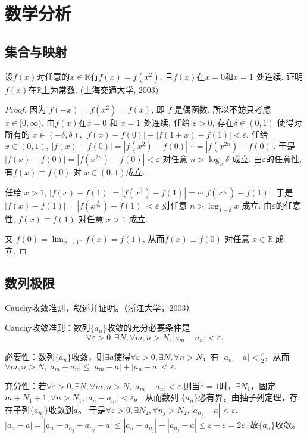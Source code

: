 \chapter{数学分析}



\section{集合与映射}

\begin{example}
设$f(x)$对任意的$x\in \mathbb{R}$有$f(x)=f(x^2)$, 且$f(x)$在$x=0$和$x=1$ 处连续. 证明$f(x)$在$\mathbb{R}$上为常数. (上海交通大学, 2003)
\end{example}

\begin{proof}
因为 $f(-x)= f(x^2) = f(x)$, 即 $f$ 是偶函数, 所以不妨只考虑 $x\in[0,\infty)$.
由$f(x)$在$x=0$ 和 $x=1$ 处连续, 
任给 $\varepsilon>0$, 存在$\delta\in(0,1)$ 使得对所有的 $x\in(-\delta,\delta)$, 
$|f(x)-f(0)| + |f(1+x)-f(1)| < \varepsilon$. 
任给 $x\in(0,1)$, $|f(x)-f(0)|=|f(x^2)-f(0)|\cdots=|f(x^{2n})-f(0)|$.
于是 $|f(x)-f(0)|=|f(x^{2n})-f(0)|<\varepsilon$ 对任意 $n> \log_x \delta$ 成立.
由$\varepsilon$的任意性, 有$f(x)\equiv f(0)$ 对 $x\in(0,1)$成立.

任给 $x>1$, $|f(x)-f(1)|=|f(x^{\frac12})-f(1)|=\cdots|f(x^{\frac1{2n}})-f(1)|$. 
于是 $|f(x)-f(1)|=|f(x^{\frac1{2n}})-f(1)|<\varepsilon$ 对任意 $n> \log_{1+\delta}x$ 成立.
由$\varepsilon$的任意性, $f(x) \equiv f(1)$ 对任意 $x>1$ 成立.

又 $f(0)=\lim_{x\rightarrow1^-}f(x)=f(1)$, 
从而$f(x)\equiv f(0)$ 对任意 $x\in \mathbb{R}$ 成立.
\end{proof}

\section{数列极限}

  \begin{example}
   Cauchy收敛准则，叙述并证明。（浙江大学，2003）
  \end{example}

  \begin{solution}
  Cauchy收敛准则：数列$\{a_n\}$收敛的充分必要条件是$$\forall\varepsilon>0,\exists N,\forall m,n>N,|a_m-a_n|<\varepsilon.$$
  
  必要性：数列$\{a_n\}$收敛，则$\exists a$使得$\forall\varepsilon>0,\exists N,\forall n>N$，有
  $|a_n-a|<\frac{\varepsilon}2$，从而$\forall m,n>N,|a_m-a_n|\leq|a_m-a|+|a_n-a|<\varepsilon.$
  
  充分性：若$\forall\varepsilon>0,\exists N,\forall m,n>N,|a_m-a_n|<\varepsilon.$则当$\varepsilon=1$时，$\exists N_1$，固定$m+N_1+1,\forall n>N_1,|a_n-a_m|<\varepsilon$。
  从而数列
  $\{a_n\}$必有界，由抽子列定理，存在子列$\{a_{n_j}\}$收敛到$a$。
  于是$\forall\varepsilon>0,\exists N_2,\forall n_j>N_2,|a_{n_j}-a|<\varepsilon.$
  $|a_n-a|=|a_n-a_{n_j}+a_{n_j}-a|\leq|a_n-a_{n_j}|+|a_{n_j}-a|\leq\varepsilon+\varepsilon=2\varepsilon$.
  故$\{a_n\}$收敛。
\end{solution}


